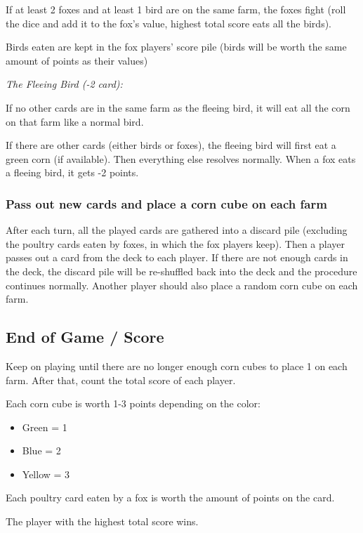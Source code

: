 \documentclass[conference]{IEEEtran}
\begin{document}
If at least 2 foxes and at least 1 bird are on the same farm, the foxes fight (roll the dice and add it to the fox's value, highest total score eats all the birds).

Birds eaten are kept in the fox players' score pile (birds will be worth the same amount of points as their values)

\vspace{0.2cm}

\textit{The Fleeing Bird (-2 card):}

If no other cards are in the same farm as the fleeing bird, it will eat all the corn on that farm like a normal bird.

If there are other cards (either birds or foxes), the fleeing bird will first eat a green corn (if available). Then everything else resolves normally. When a fox eats a fleeing bird, it gets -2 points.

\subsubsection{Pass out new cards and place a corn cube on each farm}

After each turn, all the played cards are gathered into a discard pile (excluding the poultry cards eaten by foxes, in which the fox players keep). Then a player passes out a card from the deck to each player. If there are not enough cards in the deck, the discard pile will be re-shuffled back into the deck and the procedure continues normally. Another player should also place a random corn cube on each farm.

\subsection{End of Game / Score}

Keep on playing until there are no longer enough corn cubes to place 1 on each farm. After that, count the total score of each player.

Each corn cube is worth 1-3 points depending on the color:
\begin{itemize}
    \item Green = 1
    \item Blue = 2
    \item Yellow = 3
\end{itemize}

Each poultry card eaten by a fox is worth the amount of points on the card.

The player with the highest total score wins.
\end{document}

